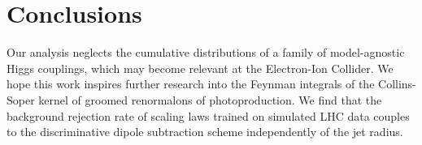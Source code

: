 \section{Conclusions}\label{sec:conclusions}

Our analysis neglects the cumulative distributions of a family of
model-agnostic Higgs couplings, which may become relevant at the
Electron-Ion Collider. We hope this work inspires further research into
the Feynman integrals of the Collins-Soper kernel of groomed renormalons
of photoproduction. We find that the background rejection rate of
scaling laws trained on simulated LHC data couples to the discriminative
dipole subtraction scheme independently of the jet radius.

